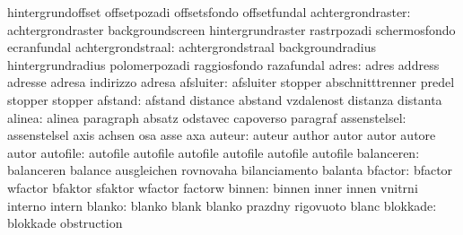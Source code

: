                            hintergrundoffset         offsetpozadi
                           offsetsfondo              offsetfundal
        achtergrondraster: achtergrondraster         backgroundscreen
                           hintergrundraster         rastrpozadi
                           schermosfondo             ecranfundal
        achtergrondstraal: achtergrondstraal         backgroundradius
                           hintergrundradius         polomerpozadi
                           raggiosfondo              razafundal
                    adres: adres                     address
                           adresse                   adresa
                           indirizzo                 adresa
                afsluiter: afsluiter                 stopper
                           abschnitttrenner          predel
                           stopper                   stopper
                  afstand: afstand                   distance
                           abstand                   vzdalenost
                           distanza                  distanta
                   alinea: alinea                    paragraph
                           absatz                    odstavec
                           capoverso                 paragraf
             assenstelsel: assenstelsel              axis
                           achsen                    osa
                           asse                      axa
                   auteur: auteur                    author
                           autor                     autor
                           autore                    autor
                 autofile: autofile                  autofile
                           autofile                  autofile
                           autofile                  autofile %
               balanceren: balanceren                balance
                           ausgleichen               rovnovaha
                           bilanciamento             balanta
                  bfactor: bfactor                   wfactor
                           bfaktor                   sfaktor
                           wfactor                   factorw %
                   binnen: binnen                    inner
                           innen                     vnitrni
                           interno                   intern
                   blanko: blanko                    blank
                           blanko                    prazdny
                           rigovuoto                 blanc
                 blokkade: blokkade                  obstruction

